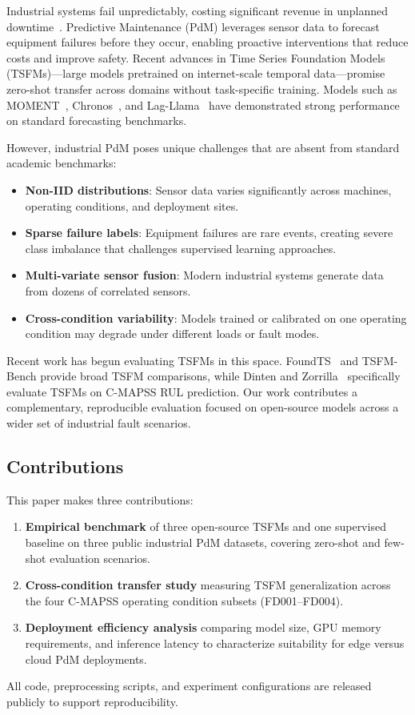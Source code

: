 Industrial systems fail unpredictably, costing significant revenue in unplanned downtime~\cite{mckinsey2023}. Predictive Maintenance (PdM) leverages sensor data to forecast equipment failures before they occur, enabling proactive interventions that reduce costs and improve safety. Recent advances in Time Series Foundation Models (TSFMs)---large models pretrained on internet-scale temporal data---promise zero-shot transfer across domains without task-specific training. Models such as MOMENT~\cite{goswami2024moment}, Chronos~\cite{ansari2024chronos}, and Lag-Llama~\cite{rasul2024lagllama} have demonstrated strong performance on standard forecasting benchmarks.

However, industrial PdM poses unique challenges that are absent from standard academic benchmarks:
\begin{itemize}
    \item \textbf{Non-IID distributions}: Sensor data varies significantly across machines, operating conditions, and deployment sites.
    \item \textbf{Sparse failure labels}: Equipment failures are rare events, creating severe class imbalance that challenges supervised learning approaches.
    \item \textbf{Multi-variate sensor fusion}: Modern industrial systems generate data from dozens of correlated sensors.
    \item \textbf{Cross-condition variability}: Models trained or calibrated on one operating condition may degrade under different loads or fault modes.
\end{itemize}

Recent work has begun evaluating TSFMs in this space. FoundTS~\cite{foundts2024} and TSFM-Bench provide broad TSFM comparisons, while Dinten and Zorrilla~\cite{dinten2025} specifically evaluate TSFMs on C-MAPSS RUL prediction. Our work contributes a complementary, reproducible evaluation focused on open-source models across a wider set of industrial fault scenarios.

\subsection{Contributions}

This paper makes three contributions:
\begin{enumerate}
    \item \textbf{Empirical benchmark} of three open-source TSFMs and one supervised baseline on three public industrial PdM datasets, covering zero-shot and few-shot evaluation scenarios.
    \item \textbf{Cross-condition transfer study} measuring TSFM generalization across the four C-MAPSS operating condition subsets (FD001--FD004).
    \item \textbf{Deployment efficiency analysis} comparing model size, GPU memory requirements, and inference latency to characterize suitability for edge versus cloud PdM deployments.
\end{enumerate}

All code, preprocessing scripts, and experiment configurations are released publicly to support reproducibility.
